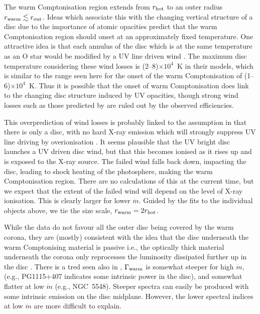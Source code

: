 \documentclass[a4paper,fleqn,usenatbib]{mnras}
\begin{document}
The warm Comptonisation region extends from $r_{\rm hot}$ to an outer
radius $r_{\rm warm}\lesssim r_{\rm out}$.  Ideas which associate this with the
changing vertical structure of a disc due to the importance of atomic
opacities predict that the warm Comptonisation region should onset at
an approximately fixed temperature.  One attractive idea is that each
annulus of the disc which is at the same temperature as an O star
would be modified by a UV line driven wind \citep{laor2014}. The
maximum disc temperature considering these wind losses is (2--8)$\times
10^4$~K in their models, which is similar to the range seen here for
the onset of the warm Comptonisation of (1--6)$\times 10^4$~K.  Thus
it is possible that the onset of warm Comptonisation does link to the
changing disc structure induced by UV opacities, though strong wind
losses such as those predicted by \cite{laor2014} are ruled out by the
observed efficiencies. 

This overprediction of wind losses is probably
linked to the assumption in \cite{laor2014} that there is only a disc,
with no hard X-ray emission which will strongly suppress UV line
driving by overionisation \citep{proga2000}. It seems plausible that
the UV bright disc launches a UV driven disc wind, but that this
becomes ionised as it rises up and is exposed to the X-ray source. The
failed wind falls back down, impacting the disc, leading to shock
heating of the photosphere, making the warm Comptonisation region. 
%
There are no  calculations of this at the current time, but we expect 
that the extent of the failed wind will depend on the level of X-ray
ionisation. This is clearly larger for lower $\dot{m}$. Guided
by the fits to the individual objects above, we tie the 
size scale, $r_{\rm warm} =2r_{\rm hot}$. 


While the data do not favour all the outer disc being
covered by the warm corona, they are (mostly) consistent with the idea
that the disc underneath the warm Comptonising material is passive
i.e., the optically thick material underneath the corona only
reprocesses the luminosity dissipated further up in the disc \citep{petrucci2017}.
%
There is a tred seen also in \citep{petrucci2017},
$\Gamma_{\rm warm}$ is somewhat steeper for high $\dot{m}$, 
(e.g., PG1115+407 indicates some intrinsic power in the disc),  
and somewhat flatter at low $\dot{m}$ (e.g., NGC~5548).
Steeper spectra can easily be produced with some intrinsic emission 
on the disc midplane.
However, the lower spectral indices at low
$\dot{m}$ are more difficult to explain.
\end{document}
